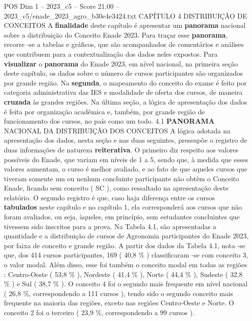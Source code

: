 \begin{textsample}{POS Dim 1 – 2023\_c5 – Score 21.00 – 2023\_c5/enade\_2023\_agro\_b30e4e3424.txt}  \label{ex:f1_pos_014}
CAPÍTULO 4 DISTRIBUIÇÃO DE CONCEITOS A \textbf{finalidade} deste capítulo é apresentar um \textbf{panorama} nacional sobre a distribuição do Conceito Enade 2023.
Para traçar esse \textbf{panorama}, recorre -se a tabelas e gráficos, que são acompanhados de comentários e análises que contribuem para a contextualização dos dados neles expostos.
Para \textbf{visualizar} o \textbf{panorama} do Enade 2023, em nível nacional, na primeira seção deste capítulo, os dados sobre o número de cursos participantes são organizados por grande região.
Na \textbf{segunda}, o mapeamento do conceito do exame é feito por categoria administrativa das IES e modalidade de oferta dos cursos, de maneira \textbf{cruzada} às grandes regiões.
Na última seção, a lógica de apresentação dos dados é feita por organização acadêmica e, também, por grande região de funcionamento dos cursos, no país como um todo. 4.1 \textbf{PANORAMA} NACIONAL DA DISTRIBUIÇÃO DOS CONCEITOS A lógica adotada na apresentação dos dados, nesta seção e nas duas seguintes, pressupõe o registro de duas informações de natureza \textbf{reiterativa}.
O primeiro diz respeito aos valores possíveis do Enade, que variam em níveis de 1 a 5, sendo que, à medida que esses valores aumentam, o curso é melhor avaliado, e ao fato de que aqueles cursos que tiveram somente um ou nenhum concluinte participante não obtêm o Conceito Enade, ficando sem conceito ( SC ), como ressaltado na apresentação deste relatório.
O segundo registro é que, caso haja diferença entre os cursos \textbf{tabulados} neste capítulo e no capítulo 1, ela corresponderá aos cursos que não foram avaliados, ou seja, àqueles, em princípio, sem estudantes concluintes que tivessem sido inscritos para a prova.
Na Tabela 4.1, são apresentadas a quantidade e a distribuição de cursos de Agronomia participantes do Enade 2023, por faixa de conceito e grande região.
A partir dos dados da Tabela 4.1, nota -se que, dos 414 cursos participantes, 169 ( 40,8 \% ) classificaram -se com conceito 3, o valor modal.
Além disso, esse foi também o conceito modal em todas as regiões : Centro-Oeste ( 53,8 \% ), Nordeste ( 41,4 \% ), Norte ( 44,4 \% ), Sudeste ( 32,8 \% ) e Sul ( 38,7 \% ).
O conceito 4 foi o segundo mais frequente em nível nacional ( 26,8 \%, correspondendo a 111 cursos ), tendo sido o segundo conceito mais frequente na maioria das regiões, exceto nas regiões Centro-Oeste e Norte.
O conceito 2 foi o terceiro ( 23,9 \%, correspondendo a 99 cursos ).

\end{textsample}
